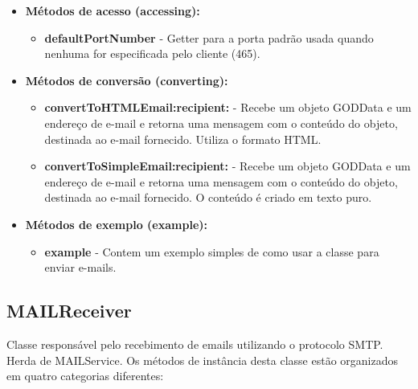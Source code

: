 \begin{itemize}
	\item \textbf{Métodos de acesso (accessing):}
	\begin{itemize}
		\item \textbf{defaultPortNumber} - Getter para a porta padrão usada quando nenhuma for especificada pelo cliente (465).
	\end{itemize}
	\item \textbf{Métodos de conversão (converting):}
	\begin{itemize} 
		\item \textbf{convertToHTMLEmail:recipient:} - Recebe um objeto GODData e um endereço de e-mail e retorna uma mensagem com o conteúdo do objeto, destinada ao e-mail fornecido. Utiliza o formato HTML.
		\item \textbf{convertToSimpleEmail:recipient:} - Recebe um objeto GODData e um endereço de e-mail e retorna uma mensagem com o conteúdo do objeto, destinada ao e-mail fornecido. O conteúdo é criado em texto puro.
	\end{itemize}
	\item \textbf{Métodos de exemplo (example):}
	\begin{itemize}
		\item \textbf{example} - Contem um exemplo simples de como usar a classe para enviar e-mails.
	\end{itemize}
\end{itemize}

\subsection{MAILReceiver}

Classe responsável pelo recebimento de emails utilizando o protocolo SMTP. Herda de MAILService. Os métodos de instância desta classe estão organizados em quatro categorias diferentes:

